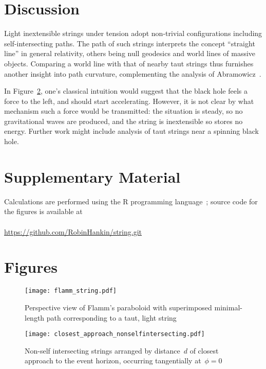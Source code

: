 \documentclass[prb,preprint]{revtex4-1}
\begin{document}
\section{Discussion}

Light inextensible strings under tension adopt non-trivial
configurations including self-intersecting paths.  The path of such
strings interprets the concept ``straight line'' in general
relativity, others being null geodesics and world lines of massive
objects.  Comparing a world line with that of nearby taut strings thus
furnishes another insight into path curvature, complementing the
analysis of Abramowicz~\cite{abramowicz1992}.

In Figure~\ref{closest_approach_non_self_intersecting}, one's
classical intuition would suggest that the black hole feels a force to
the left, and should start accelerating.  However, it is not clear by
what mechanism such a force would be transmitted: the situation is
steady, so no gravitational waves are produced, and the string is
inextensible so stores no energy.  Further work might include analysis
of taut strings near a spinning black hole.




\section*{Supplementary Material}

Calculations are performed using the R programming language~\citep{rcore2018};
source code for the figures is available at
\\
\\
\url{https://github.com/RobinHankin/string.git}


\section*{Figures}

\begin{figure}[h!] %
\centering
\texttt{[image: flamm\_string.pdf]}
\caption{Perspective view of Flamm's paraboloid with superimposed minimal-length
  path corresponding to a taut, light string}
\label{flamm}
\end{figure}

\begin{figure}[p] %
\centering
\texttt{[image: closest\_approach\_nonselfintersecting.pdf]}
\caption{Non-self intersecting strings arranged by distance~$d$ of
  closest approach to the event horizon, occurring tangentially
  at~$\phi=0$}
\label{closest_approach_non_self_intersecting}
\end{figure}
\end{document}
